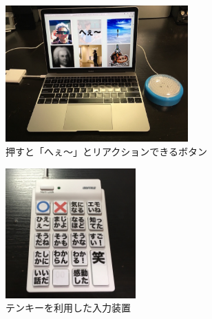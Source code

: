 \begin{figure}[h]
\centering
\includegraphics[width=7cm]{images/heebutton.png}
\caption{押すと「へぇ〜」とリアクションできるボタン}
\label{heebutton}
\end{figure}

\begin{figure}[h]
\centering
\includegraphics[width=5cm]{images/10key.png}
\caption{テンキーを利用した入力装置}
\label{10key}
\end{figure}
